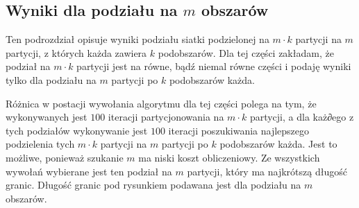 \subsection{Wyniki dla podziału na $m$ obszarów}

Ten podrozdział opisuje wyniki podziału siatki podzielonej na $m \cdot k$ partycji na $m$ partycji, z których każda
zawiera $k$ podobszarów.
Dla tej części zakładam, że podział na $m \cdot k$ partycji jest na równe, bądź niemal równe części i podaję
wyniki tylko dla podziału na $m$ partycji po $k$ podobszarów każda.

Różnica w postacji wywołania algorytmu dla tej części polega na tym, że wykonywanych jest $100$ iteracji
partycjonowania na $m \cdot k$ partycji, a dla każ∂ego z tych podziałów wykonywanie jest $100$ iteracji poszukiwania
najlepszego podzielenia tych $m \cdot k$ partycji na $m$ partycji po $k$ podobszarów każda.
Jest to możliwe, ponieważ szukanie $m$ ma niski koszt obliczeniowy.
Ze wszystkich wywołań wybierane jest ten podział na $m$ partycji, który ma najkrótszą długość granic.
Długość granic pod rysunkiem podawana jest dla podziału na $m$ obszarów.

